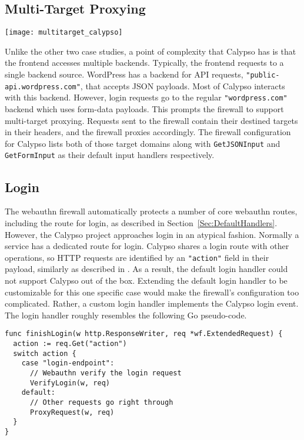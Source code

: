\subsection{Multi-Target Proxying}

\begin{center}
\texttt{[image: multitarget\_calypso]}
\end{center}

Unlike the other two case studies, a point of complexity that Calypso has is that the frontend accesses multiple backends. Typically, the frontend requests to a single backend source. WordPress has a backend for API requests, \lstinline{"public-api.wordpress.com"}, that accepts JSON payloads. Most of Calypso interacts with this backend. However, login requests go to the regular \lstinline{"wordpress.com"} backend which uses form-data payloads. This prompts the firewall to support multi-target proxying. Requests sent to the firewall contain their destined targets in their headers, and the firewall proxies accordingly. The firewall configuration for Calypso lists both of those target domains along with \lstinline{GetJSONInput} and \lstinline{GetFormInput} as their default input handlers respectively. 

\subsection{Login}\label{Sec:CalypsoLogin}

The webauthn firewall automatically protects a number of core webauthn routes, including the route for login, as described in Section~\ref{Sec:DefaultHandlers}. However, the Calypso project approaches login in an atypical fashion. Normally a service has a dedicated route for login. Calypso shares a login route with other operations, so HTTP requests are identified by an \lstinline{"action"} field in their payload, similarly as described in \label{Sec:CustomHandlers}. As a result, the default login handler could not support Calypso out of the box. Extending the default login handler to be customizable for this one specific case would make the firewall's configuration too complicated. Rather, a custom login handler implements the Calypso login event. The login handler roughly resembles the following Go pseudo-code.

\begin{lstlisting}
func finishLogin(w http.ResponseWriter, req *wf.ExtendedRequest) {
  action := req.Get("action")
  switch action {
    case "login-endpoint":
      // Webauthn verify the login request
      VerifyLogin(w, req)
    default:
      // Other requests go right through
      ProxyRequest(w, req)
  }
}
\end{lstlisting}


